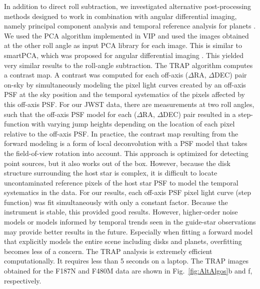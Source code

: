 \documentclass[longauth]{aa}
\newcommand{\vc}[1]{#1}
\begin{document}
\begin{appendix}
In addition to direct roll subtraction, we investigated alternative post-processing methods designed to work in combination with angular differential imaging, namely principal component analysis \citep[PCA;][]{Soummer2012, Amara2012} and temporal reference analysis for planets \citep[TRAP;][]{Samland2021}. We used the PCA algorithm implemented in VIP and used the images obtained at the other roll angle as input PCA library for each image. This is similar to smartPCA, which was proposed for angular differential imaging \citep{Absil2013}. This yielded very similar results to the roll-angle subtraction.
The TRAP algorithm computes a contrast map. A contrast was computed for each off-axis ($\Delta$RA, $\Delta$DEC) pair on-sky by simultaneously modeling the pixel light curves created by an off-axis PSF at the sky position and the temporal systematics of the pixels affected by this off-axis PSF. For our JWST data, there are measurements at two roll angles, such that the off-axis PSF model for each ($\Delta$RA, $\Delta$DEC) pair resulted in a step-function with varying jump heights depending on the location of each pixel relative to the off-axis PSF.
In practice, the contrast map resulting from the \vc{forward modeling} is a form of local deconvolution with a PSF model that takes the field-of-view rotation into account.
This approach is optimized for detecting point sources, but it also works out of the box. However, because the disk structure surrounding the host star is complex, it is difficult to locate uncontaminated reference pixels of the host star PSF to model the temporal systematics in the data. For our results, each off-axis PSF pixel light curve (step function) was fit simultaneously with only a constant factor. Because the instrument is stable, this provided good results. However, higher-order noise models or models informed by temporal trends seen in the guide-star observations may provide better results in the future. Especially when fitting a \vc{forward model} that explicitly models the entire scene including disks and planets, overfitting becomes less of a concern. The TRAP analysis is extremely efficient computationally. It requires less than 5 seconds on a laptop. The TRAP images obtained for the F187N and F480M data are shown in Fig.~\ref{fig:AltAlgos}b and f, respectively.


\end{appendix}
\end{document}
